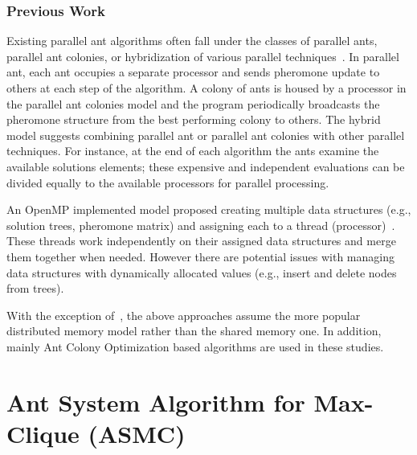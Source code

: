 \documentclass[11pt]{article}
\begin{document}
\subsubsection{Previous Work}

Existing parallel ant algorithms often fall under the classes of parallel ants, parallel ant colonies, or hybridization of various parallel techniques~\cite{TRFR,RL,CR,B1,MRS,DHKLR,Stutzle,MBSD}.  In parallel ant, each ant occupies a separate processor and sends pheromone update to others at each step of the algorithm. A colony of ants is housed by a processor in the parallel ant colonies model and the program periodically broadcasts the pheromone structure from the best performing colony to others.  The hybrid model suggests combining parallel ant or parallel ant colonies with other parallel techniques. For instance, at the end of each algorithm the ants examine the available solutions elements; these expensive and independent evaluations can be divided equally to the available processors for parallel processing.

An OpenMP implemented model proposed creating multiple data structures (e.g., solution trees,  pheromone matrix) and assigning each to a thread (processor)~\cite{PKGG}.  These threads work independently on their assigned data structures and merge them together when needed.  However there are potential issues with managing data structures with dynamically allocated values (e.g., insert and delete nodes from trees).

With the exception of~\cite{PKGG}, the above approaches assume the more popular distributed memory model rather than the shared memory one. In addition, mainly Ant Colony Optimization based algorithms are used in these studies.



\section{Ant System Algorithm for Max-Clique (ASMC)}\label{algorithm}
\end{document}
